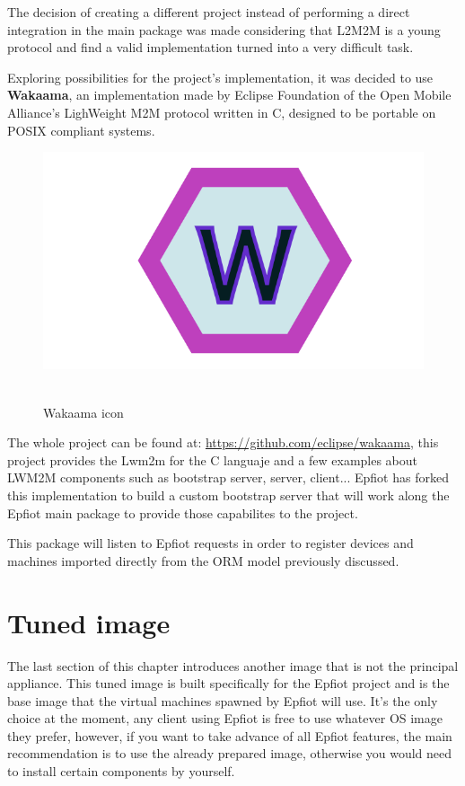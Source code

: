The decision of creating a different project instead of performing a direct integration in the main package was made considering that L2M2M is a young protocol and find a valid implementation turned into a very difficult task.
\newpage

Exploring possibilities for the project's implementation, it was decided to use \textbf{Wakaama}, an implementation made by Eclipse Foundation of the Open Mobile Alliance's LighWeight M2M protocol written in C, designed to be portable on POSIX compliant systems.

\begin{figure}[h]%
\centering
    \includegraphics[width=4.5in]{figures/Wakaama.png}
~\caption{Wakaama icon}
\label{figure3.6}
\end{figure}

The whole project can be found at: \url{https://github.com/eclipse/wakaama}, this project provides the Lwm2m for the C languaje and a few examples about LWM2M components such as bootstrap server, server, client... Epfiot has forked this implementation to build a custom bootstrap server that will work along the Epfiot main package to provide those capabilites to the project.

This package will listen to Epfiot requests in order to register devices and machines imported directly from the ORM model previously discussed.


\newpage
\section{Tuned image}
\label{makereference3.3}

The last section of this chapter introduces another image that is not the principal appliance. This tuned image is built specifically for the Epfiot project and is the base image that the virtual machines spawned by Epfiot will use. It's the only choice at the moment, any client using Epfiot is free to use whatever OS image they prefer, however, if you want to take advance of all Epfiot features, the main recommendation is to use the already prepared image, otherwise you would need to install certain components by yourself.

